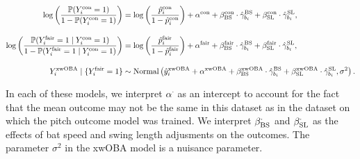 \documentclass{article}
\begin{document}
      \begin{align}
        \label{eqn:causal-contact}
        \log \left(
          \frac{\mathbb{P}(Y_i^{\mbox{\scriptsize con}} = 1)}{1 - \mathbb{P}(Y_i^{\mbox{\scriptsize con}} = 1)}
        \right) &= \log \left(
          \frac{\hat p_i^{\mbox{\scriptsize con}}}{1 - \hat p_i^{\mbox{\scriptsize con}}}
        \right) +
          \alpha^{\mbox{\scriptsize con}} +
          \beta_{\mbox{\scriptsize BS}}^{\mbox{\scriptsize con}} \cdot
            \hat\gamma_{b_i}^{\mbox{\scriptsize BS}} +
          \beta_{\mbox{\scriptsize SL}}^{\mbox{\scriptsize con}} \cdot
            \hat\gamma_{b_i}^{\mbox{\scriptsize SL}},\\[10pt]
        \label{eqn:causal-fair}
        \log \left(
          \frac{
            \mathbb{P}(Y_i^{\mbox{\scriptsize fair}} = 1 \mid Y_i^{\mbox{\scriptsize con}} = 1)
          }{
            1 - \mathbb{P}(Y_i^{\mbox{\scriptsize fair}} = 1 \mid Y_i^{\mbox{\scriptsize con}} = 1)
          }
        \right) &= \log \left(
          \frac{\hat p_i^{\mbox{\scriptsize fair}}}{1 - \hat p_i^{\mbox{\scriptsize fair}}}
        \right) +
          \alpha^{\mbox{\scriptsize fair}} +
          \beta_{\mbox{\scriptsize BS}}^{\mbox{\scriptsize fair}} \cdot
            \hat\gamma_{b_i}^{\mbox{\scriptsize BS}} +
          \beta_{\mbox{\scriptsize SL}}^{\mbox{\scriptsize fair}} \cdot
            \hat\gamma_{b_i}^{\mbox{\scriptsize SL}},\\[10pt]
        \label{eqn:causal-hit}
        Y_i^{\mbox{\scriptsize xwOBA}} \mid \{Y_i^{\mbox{\scriptsize fair}} = 1\} &\sim
          \mbox{Normal}\left(
            \hat y_i^{\mbox{\scriptsize xwOBA}} +
              \alpha^{\mbox{\scriptsize xwOBA}} +
              \beta_{\mbox{\scriptsize BS}}^{\mbox{\scriptsize xwOBA}} \cdot
                \hat\gamma_{b_i}^{\mbox{\scriptsize BS}} +
              \beta_{\mbox{\scriptsize SL}}^{\mbox{\scriptsize xwOBA}} \cdot
                \hat\gamma_{b_i}^{\mbox{\scriptsize SL}},
            \sigma^2
          \right).
      \end{align}

      In each of these models, we interpret $\alpha^\cdot$ as an intercept to account for the fact that the mean outcome may not be the same in this dataset as in the dataset on which the pitch outcome model was trained. We interpret $\beta_{\mbox{\scriptsize BS}}^{\cdot}$ and $\beta_{\mbox{\scriptsize SL}}^{\cdot}$ as the effects of bat speed and swing length adjusments on the outcomes. The parameter $\sigma^2$ in the xwOBA model is a nuisance parameter.
\end{document}
